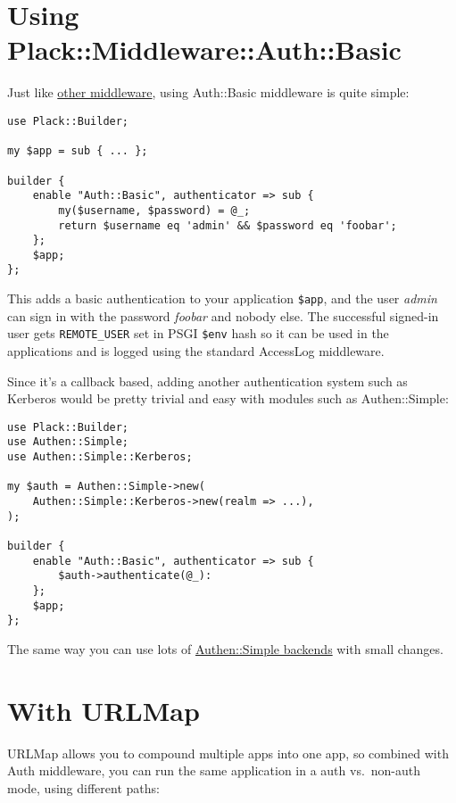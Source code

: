 \section{Using
Plack::Middleware::Auth::Basic}\label{using-plackmiddlewareauthbasic}

Just like
\href{http://advent.plackperl.org/2009/12/day-10-using-plack-middleware.html}{other
middleware}, using Auth::Basic middleware is quite simple:

\begin{lstlisting}
use Plack::Builder;

my $app = sub { ... };

builder {
    enable "Auth::Basic", authenticator => sub {
        my($username, $password) = @_;
        return $username eq 'admin' && $password eq 'foobar';
    };
    $app;
};
\end{lstlisting}

This adds a basic authentication to your application \lstinline!$app!,
and the user \emph{admin} can sign in with the password \emph{foobar}
and nobody else. The successful signed-in user gets
\lstinline!REMOTE_USER! set in PSGI \lstinline!$env! hash so it can be
used in the applications and is logged using the standard AccessLog
middleware.

Since it's a callback based, adding another authentication system such
as Kerberos would be pretty trivial and easy with modules such as
Authen::Simple:

\begin{lstlisting}
use Plack::Builder;
use Authen::Simple;
use Authen::Simple::Kerberos;

my $auth = Authen::Simple->new(
    Authen::Simple::Kerberos->new(realm => ...),
);

builder {
    enable "Auth::Basic", authenticator => sub {
        $auth->authenticate(@_):
    };
    $app;
};
\end{lstlisting}

The same way you can use lots of
\href{http://search.cpan.org/search?query=authen+simple\&mode=all}{Authen::Simple
backends} with small changes.

\section{With URLMap}\label{with-urlmap}

URLMap allows you to compound multiple apps into one app, so combined
with Auth middleware, you can run the same application in a auth
vs.~non-auth mode, using different paths:

